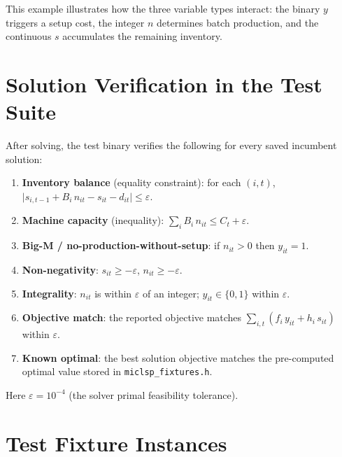 \documentclass[11pt,a4paper]{article}
\begin{document}
This example illustrates how the three variable types interact: the binary
$y$ triggers a setup cost, the integer $n$ determines batch production, and
the continuous $s$ accumulates the remaining inventory.

\section{Solution Verification in the Test Suite}

After solving, the test binary verifies the following for every saved
incumbent solution:

\begin{enumerate}[leftmargin=2em]
  \item \textbf{Inventory balance} (equality constraint): for each $(i,t)$,
    $\lvert s_{i,t-1} + B_i\,n_{it} - s_{it} - d_{it}\rvert \le \varepsilon$.
  \item \textbf{Machine capacity} (inequality): $\sum_i B_i\,n_{it}\le C_t+\varepsilon$.
  \item \textbf{Big-M / no-production-without-setup}:
    if $n_{it}>0$ then $y_{it}=1$.
  \item \textbf{Non-negativity}: $s_{it}\ge -\varepsilon$, $n_{it}\ge -\varepsilon$.
  \item \textbf{Integrality}: $n_{it}$ is within $\varepsilon$ of an integer;
    $y_{it}\in\{0,1\}$ within $\varepsilon$.
  \item \textbf{Objective match}: the reported objective matches
    $\sum_{i,t}(f_i\,y_{it}+h_i\,s_{it})$ within $\varepsilon$.
  \item \textbf{Known optimal}: the best solution objective matches the
    pre-computed optimal value stored in \texttt{miclsp\_fixtures.h}.
\end{enumerate}

Here $\varepsilon = 10^{-4}$ (the solver primal feasibility tolerance).

\section{Test Fixture Instances}
\end{document}

